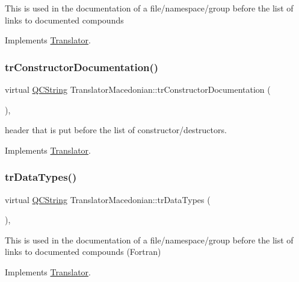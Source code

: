 This is used in the documentation of a file/namespace/group before the list of links to documented compounds 

Implements \mbox{\hyperlink{class_translator}{Translator}}.

\mbox{\label{class_translator_macedonian_a3c69119cdcdbc6fb1d613edce1defe56}} 
\subsubsection{\texorpdfstring{trConstructorDocumentation()}{trConstructorDocumentation()}}
{\footnotesize\ttfamily virtual \mbox{\hyperlink{class_q_c_string}{Q\+C\+String}} Translator\+Macedonian\+::tr\+Constructor\+Documentation (\begin{DoxyParamCaption}{ }\end{DoxyParamCaption})\hspace{0.3cm}{\ttfamily [inline]}, {\ttfamily [virtual]}}

header that is put before the list of constructor/destructors. 

Implements \mbox{\hyperlink{class_translator}{Translator}}.

\mbox{\label{class_translator_macedonian_acc5a393e1abb3dfcc5ff2d11b357c585}} 
\subsubsection{\texorpdfstring{trDataTypes()}{trDataTypes()}}
{\footnotesize\ttfamily virtual \mbox{\hyperlink{class_q_c_string}{Q\+C\+String}} Translator\+Macedonian\+::tr\+Data\+Types (\begin{DoxyParamCaption}{ }\end{DoxyParamCaption})\hspace{0.3cm}{\ttfamily [inline]}, {\ttfamily [virtual]}}

This is used in the documentation of a file/namespace/group before the list of links to documented compounds (Fortran) 

Implements \mbox{\hyperlink{class_translator}{Translator}}.

